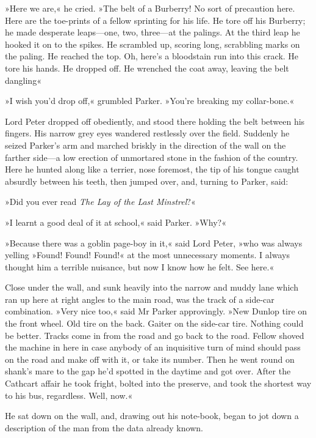 »Here we are,« he cried. »The belt of a Burberry! No sort of precaution here. Here are the toe-prints of a fellow sprinting for his life. He tore off his Burberry; he made desperate leaps\allowbreak---\allowbreak one, two, three\allowbreak---\allowbreak at the palings. At the third leap he hooked it on to the spikes. He scrambled up, scoring long, scrabbling marks on the paling. He reached the top. Oh, here's a bloodstain run into this crack. He tore his hands. He dropped off. He wrenched the coat away, leaving the belt dangling\longdash«

»I wish you'd drop off,« grumbled Parker. »You're breaking my collar-bone.«

Lord Peter dropped off obediently, and stood there holding the belt between his fingers. His narrow grey eyes wandered restlessly over the field. Suddenly he seized Parker's arm and marched briskly in the direction of the wall on the farther side\allowbreak---\allowbreak a low erection of unmortared stone in the fashion of the country. Here he hunted along like a terrier, nose foremost, the tip of his tongue caught absurdly between his teeth, then jumped over, and, turning to Parker, said:

»Did you ever read \textit{The Lay of the Last Minstrel}?«

»I learnt a good deal of it at school,« said Parker. »Why?«

»Because there was a goblin page-boy in it,« said Lord Peter, »who was always yelling »Found! Found! Found!« at the most unnecessary moments.  I always thought him a terrible nuisance, but now I know how he felt.  See here.«

Close under the wall, and sunk heavily into the narrow and muddy lane which ran up here at right angles to the main road, was the track of a side-car combination.
»Very nice too,« said Mr Parker approvingly. »New Dunlop tire on the front wheel. Old tire on the back. Gaiter on the side-car tire.  Nothing could be better. Tracks come in from the road and go back to the road. Fellow shoved the machine in here in case anybody of an inquisitive turn of mind should pass on the road and make off with it, or take its number. Then he went round on shank's mare to the gap he'd spotted in the daytime and got over. After the Cathcart affair he took fright, bolted into the preserve, and took the shortest way to his bus, regardless. Well, now.«

He sat down on the wall, and, drawing out his note-book, began to jot down a description of the man from the data already known.

